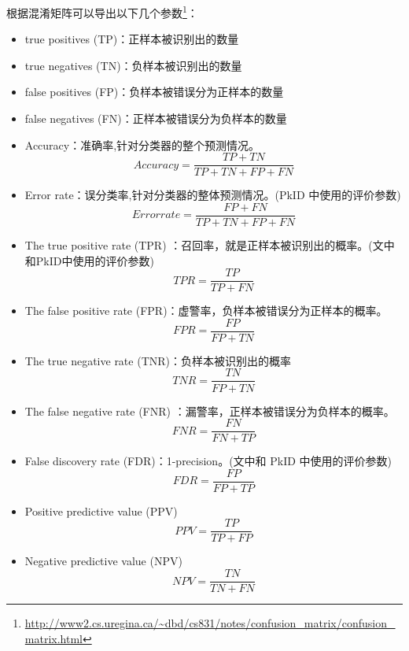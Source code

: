 根据混淆矩阵可以导出以下几个参数\footnote{\url{http://www2.cs.uregina.ca/~dbd/cs831/notes/confusion_matrix/confusion_matrix.html}}：
\begin{itemize}
    \item true positives (TP)：正样本被识别出的数量
    \item true negatives (TN)：负样本被识别出的数量
    \item false positives (FP)：负样本被错误分为正样本的数量
    \item false negatives (FN)：正样本被错误分为负样本的数量\newline
    
    \item Accuracy：准确率,针对分类器的整个预测情况。
        \begin{displaymath}
            Accuracy=\frac{TP+TN}{TP+TN+FP+FN}
        \end{displaymath}
    \item {\color{red}Error rate：误分类率,针对分类器的整体预测情况。}(PkID 中使用的评价参数)
        \begin{displaymath}
            Error rate=\frac{FP+FN}{TP+TN+FP+FN}
        \end{displaymath}
    \item {\color{blue}The true positive rate (TPR) ：召回率，就是正样本被识别出的概率。}(文中和PkID中使用的评价参数)
        \begin{displaymath}
            TPR=\frac{TP}{TP+FN}
        \end{displaymath}
     \item The false positive rate (FPR)：虚警率，负样本被错误分为正样本的概率。
        \begin{displaymath}
            FPR=\frac{FP}{FP+TN}
        \end{displaymath}
    \item The true negative rate (TNR)：负样本被识别出的概率
        \begin{displaymath}
            TNR=\frac{TN}{FP+TN}
        \end{displaymath}

    \item The false negative rate (FNR) ：漏警率，正样本被错误分为负样本的概率。
        \begin{displaymath}
            FNR=\frac{FN}{FN+TP}
        \end{displaymath}
    \item {\color{blue}False discovery rate (FDR)：1-precision。}(文中和 PkID 中使用的评价参数)
        \begin{displaymath}
            FDR=\frac{FP}{FP+TP}
        \end{displaymath}
    \item Positive predictive value (PPV)
        \begin{displaymath}
            PPV=\frac{TP}{TP+FP}
        \end{displaymath}
    \item Negative predictive value (NPV)
        \begin{displaymath}
            NPV=\frac{TN}{TN+FN}
        \end{displaymath}
    

\end{itemize}
